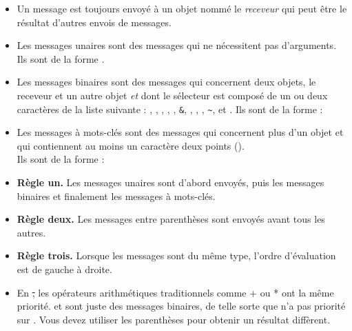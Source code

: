 \documentclass[a4paper,10pt,twoside]{book}
\begin{document}
\begin{itemize}
\item Un message est toujours envoy\'e \`a un objet nomm\'e le \emph{receveur} qui peut \^etre le r\'esultat d'autres envois de messages.

\item Les messages unaires sont des messages qui ne n\'ecessitent pas d'arguments.\\
Ils sont de la forme .

\item Les messages binaires sont des messages qui concernent deux objets, le receveur et un autre objet \emph{et} dont le s\'electeur est compos\'e de un ou deux caract\`eres de la liste suivante : \ct{+}, \ct{-}, \ct{*}, \ct{/}, \ct{|}, \texttt{\&}, \ct{=}, \ct{>}, \ct{<}, \texttt{\~}, et .
Ils sont de la forme : 
\item Les messages \`a mots-cl\'es sont des messages qui concernent plus d'un objet et qui contiennent au moins un caract\`ere deux points (\ct{:}). \\
Ils sont de la forme : 

\item \textbf{R\`egle un.} Les messages unaires sont d'abord envoy\'es, puis les messages binaires et finalement les messages \`a mots-cl\'es.
\item \textbf{R\`egle deux.} Les messages entre parenth\`eses sont envoy\'es avant tous les autres.
\item \textbf{R\`egle trois.} Lorsque les messages sont du m\^eme type, l'ordre d'\'evaluation est de gauche \`a droite.
\item En \st, les op\'erateurs arithm\'etiques traditionnels comme + ou * ont la m\^eme priorit\'e. \ct{+} et \ct{*} sont juste des messages binaires, de telle sorte que \ct{*} n'a pas priorit\'e sur \ct{+}. Vous devez utiliser les parenth\`eses pour obtenir un r\'esultat diff\`erent.
\end{itemize}

\ifx\wholebook\relax\else
\end{document}
